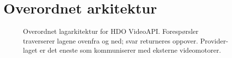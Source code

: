 \section{Overordnet arkitektur}
\label{sec:arkitektur}

\begin{figure}[htbp]
\centering

\caption{Overordnet lagarkitektur for HDO VideoAPI. Forespørsler traverserer 
lagene ovenfra og ned; svar returneres oppover. Provider-laget er det eneste 
som kommuniserer med eksterne videomotorer.}
\label{fig:lagarkitektur}
\end{figure}